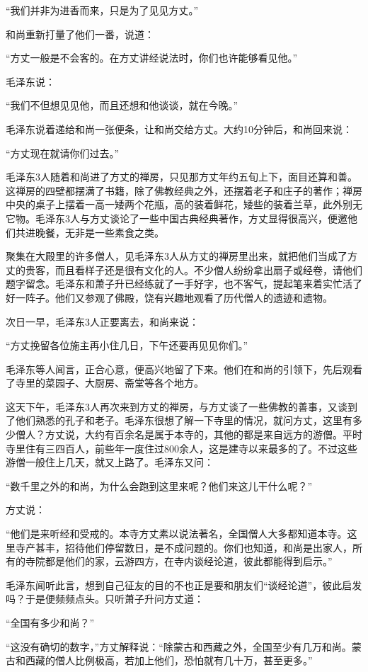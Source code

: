 \documentclass[../../dazhuan.tex]{subfiles}
\begin{document}
“我们并非为进香而来，只是为了见见方丈。”

和尚重新打量了他们一番，说道：

“方丈一般是不会客的。在方丈讲经说法时，你们也许能够看见他。”

毛泽东说：

“我们不但想见见他，而且还想和他谈谈，就在今晚。”

毛泽东说着递给和尚一张便条，让和尚交给方丈。大约10分钟后，和尚回来说：

“方丈现在就请你们过去。”

毛泽东3人随着和尚进了方丈的禅房，只见那方丈年约五旬上下，面目还算和善。这禅房的四壁都摆满了书籍，除了佛教经典之外，还摆着老子和庄子的著作；禅房中央的桌子上摆着一高一矮两个花瓶，高的装着鲜花，矮些的装着兰草，此外别无它物。毛泽东3人与方丈谈论了一些中国古典经典著作，方丈显得很高兴，便邀他们共进晚餐，无非是一些素食之类。

聚集在大殿里的许多僧人，见毛泽东3人从方丈的禅房里出来，就把他们当成了方丈的贵客，而且看样子还是很有文化的人。不少僧人纷纷拿出扇子或经卷，请他们题字留念。毛泽东和萧子升已经练就了一手好字，也不客气，提起笔来着实忙活了好一阵子。他们又参观了佛殿，饶有兴趣地观看了历代僧人的遗迹和遗物。

次日一早，毛泽东3人正要离去，和尚来说：

“方丈挽留各位施主再小住几日，下午还要再见见你们。”

毛泽东等人闻言，正合心意，便高兴地留了下来。他们在和尚的引领下，先后观看了寺里的菜园子、大厨房、斋堂等各个地方。

这天下午，毛泽东3人再次来到方丈的禅房，与方丈谈了一些佛教的善事，又谈到了他们熟悉的孔子和老子。毛泽东很想了解一下寺里的情况，就问方丈，这里有多少僧人？方丈说，大约有百余名是属于本寺的，其他的都是来自远方的游僧。平时寺里住有三四百人，前些年一度住过800余人，这是建寺以来最多的了。不过这些游僧一般住上几天，就又上路了。毛泽东又问：

“数千里之外的和尚，为什么会跑到这里来呢？他们来这儿干什么呢？”

方丈说：

“他们是来听经和受戒的。本寺方丈素以说法著名，全国僧人大多都知道本寺。这里寺产甚丰，招待他们停留数日，是不成问题的。你们也知道，和尚是出家人，所有的寺院都是他们的家，云游四方，在寺内谈经论道，彼此都能得到启示。”

毛泽东闻听此言，想到自己征友的目的不也正是要和朋友们“谈经论道”，彼此启发吗？于是便频频点头。只听萧子升问方丈道：

“全国有多少和尚？”

“这没有确切的数字，”方丈解释说：“除蒙古和西藏之外，全国至少有几万和尚。蒙古和西藏的僧人比例极高，若加上他们，恐怕就有几十万，甚至更多。”
\end{document}
